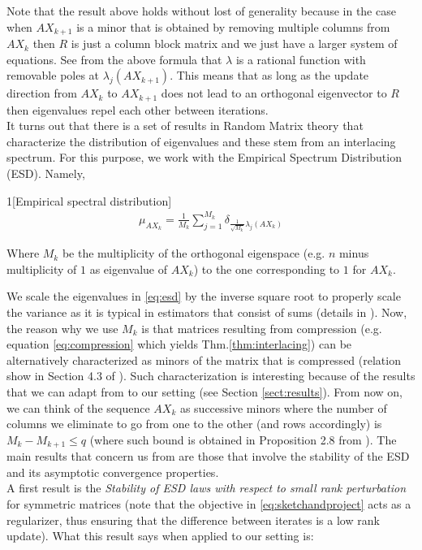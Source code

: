 \documentclass[12pt,conference,compsocconf]{IEEEtran}
\begin{document}
Note that the result above holds without lost of generality because in the case when $AX_{k+1}$ is a minor that is obtained by removing multiple columns from $AX_k$ then $R$ is just a column block matrix and we just have a larger system of equations.
See from the above formula that $\lambda$ is a rational function with removable poles at $\lambda_j(AX_{k+1})$. This means that as long as the update direction from $AX_k$ to $AX_{k+1}$ does not lead to an orthogonal eigenvector to $R$ then eigenvalues repel each other between iterations.\\
It turns out that there is a set of results in Random Matrix theory that characterize the distribution of eigenvalues and these stem from an interlacing spectrum. For this purpose, we work with the Empirical Spectrum Distribution (ESD). Namely,
\begin{customdefinition}{1}[Empirical spectral distribution]
\begin{align}\label{eq:esd}
	\mu_{AX_k} = \frac{1}{M_k} \sum _{j=1}^{M_k} \delta_{\frac{1}{\sqrt{M_k}}\lambda_j(AX_k)}
\end{align}

Where $M_k$ be the multiplicity of the orthogonal eigenspace (e.g. $n$ minus multiplicity of $1$ as eigenvalue of $AX_k$) to the one corresponding to $1$ for $AX_k$. 
\end{customdefinition}
We scale the eigenvalues in \ref{eq:esd} by the inverse square root to properly scale the variance as it is typical in estimators that consist of sums (details in \cite{Tao}).
Now, the reason why we use $M_k$ is that matrices resulting from compression (e.g. equation \ref{eq:compression} which yields Thm.\ref{thm:interlacing}) can be alternatively characterized as minors of the matrix that is compressed (relation show in Section 4.3 of \cite{Horn}). Such characterization is interesting because of the results that we can adapt from \cite{Tao} to our setting (see Section \ref{sect:results}). From now on, we can think of the sequence $AX_k$ as successive minors where the number of columns we eliminate to go from one to the other (and rows accordingly) is $M_k-M_{k+1} \leq q$ (where such bound is obtained in Proposition 2.8 from \cite{Gratton}).
The main results that concern us from \cite{Tao} are those that involve the stability of the ESD and its asymptotic convergence properties.\\
A first result is the \textit{Stability of ESD laws with respect to small rank perturbation} for symmetric matrices (note that the objective in \ref{eq:sketchandproject} acts as a regularizer, thus ensuring that the difference between iterates is a low rank update). What this result says when applied to our setting is:\\ 
\end{document}
